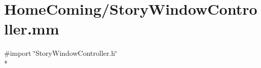 \hypertarget{_story_window_controller_8mm}{\section{Home\-Coming/\-Story\-Window\-Controller.mm}
\label{_story_window_controller_8mm}
}
{\ttfamily \#import \char`\"{}Story\-Window\-Controller.\-h\char`\"{}}\\*

